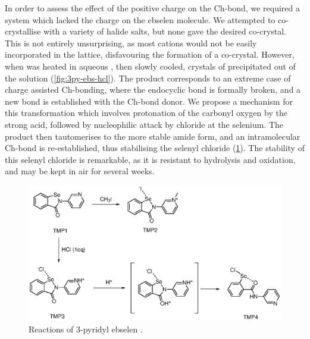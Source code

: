 \begin{refsection}
In order to assess the effect of the positive charge on the Ch-bond, we required a system which lacked the charge on the ebselen molecule.
We attempted to co-crystallise  with a variety of halide salts, but none gave the desired co-crystal.
This is not entirely unsurprising, as most cations would not be easily incorporated in the lattice, disfavouring the formation of a co-crystal.
However, when  was heated in aqueous , then slowly cooled, crystals of  precipitated out of the solution (\cref{fig:3py-ebs-hcl}).
The product  corresponds to an extreme case of charge assisted Ch-bonding, where the endocyclic  bond is formally broken, and a new bond is established with the Ch-bond donor.
We propose a mechanism for this transformation which involves protonation of the carbonyl oxygen by the strong acid, followed by nucleophilic attack by chloride at the selenium.
The product then tautomerises to the more stable amide form, and an intramolecular Ch-bond is re-established, thus stabilising the selenyl chloride (\cref{sch:selenylchloride-mechanism}).
The stability of this selenyl chloride is remarkable, as it is resistant to hydrolysis and oxidation, and may be kept in air for several weeks.

\begin{figure}
    \centering
    \includegraphics[scale=0.74]{Figures/ebs-3py-scheme.eps}
    \caption{Reactions of 3-pyridyl ebselen .}
    \label{sch:selenylchloride-mechanism}
\end{figure}


\end{refsection}

